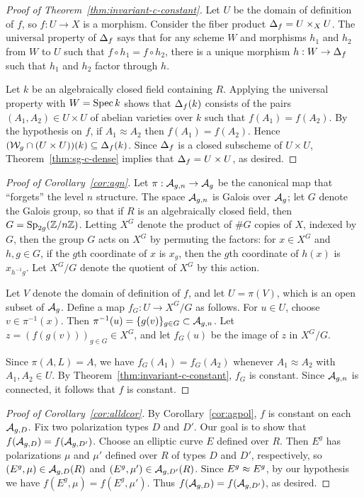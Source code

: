 \documentclass{amsart}
\begin{document}
\begin{proof}[Proof of Theorem~\ref{thm:invariant-c-constant}]
  Let $U$ be the domain of definition of $f$, so $f: U \to X$ is a morphism. Consider the fiber product $\Delta_f = U \times_X U$.
  The universal property of $\Delta_f$ says that for any scheme $W$ and morphisms $h_1$ and $h_2$ from $W$ to $U$ such that $f \circ h_1 = f \circ h_2$, there is a unique morphism $h: W \to \Delta_f$ such that $h_1$ and $h_2$ factor through $h$.

  Let $k$ be an algebraically closed field containing $R$.
  Applying the universal property with $W = \operatorname{Spec} k$ shows that $\Delta_f(k)$ consists of the pairs $(A_1,A_2) \in U \times U$ of abelian varieties over $k$ such that $f(A_1) = f(A_2)$.
  By the hypothesis on $f$, if $A_1 \approx A_2$ then $f(A_1) = f(A_2)$. Hence $(\mathcal{W}_g \cap (U \times U))(k) \subseteq \Delta_f(k)$.
  Since $\Delta_f$ is a closed subscheme of $U \times U$, Theorem~\ref{thm:sg-c-dense} implies that $\Delta_f = U \times U$, as desired.
\end{proof}

\begin{proof}[Proof of Corollary~\ref{cor:agn}]
  Let $\pi: \mathcal{A}_{g,n} \to \mathcal{A}_g$ be the canonical map that ``forgets'' the level $n$ structure. The space $\mathcal{A}_{g,n}$ is Galois over $\mathcal{A}_g$; let $G$ denote the Galois group, so that if $R$ is an algebraically closed field, then $G = \operatorname{Sp}_{2g}(\mathbb{Z}/n\mathbb{Z})$. Letting $X^G$ denote the product of $\# G$ copies of $X$, indexed by $G$, then the group $G$ acts on $X^G$ by permuting the factors: for $x \in X^G$ and $h,g \in G$, if the $g$th coordinate of $x$ is $x_g$, then the $g$th coordinate of $h(x)$ is $x_{h^{-1}g}$.
  Let $X^G/G$ denote the quotient of $X^G$ by this action.

  Let $V$ denote the domain of definition of $f$, and let $U = \pi(V)$, which is an open subset of $\mathcal{A}_g$. Define a map $f_G: U \to X^G/G$ as follows. For $u \in U$, choose  $v \in \pi^{-1}(x)$. Then $\pi^{-1}(u) = \{g(v)\}_{g \in G} \subset \mathcal{A}_{g,n}$. Let $z = (f(g(v)))_{g \in G} \in X^G$, and let $f_G(u)$ be the image of $z$ in $X^G/G$.

  Since $\pi(A,L) = A$, we have $f_G(A_1) = f_G(A_2)$ whenever $A_1 \approx A_2$ with $A_1,A_2 \in U$. By Theorem~\ref{thm:invariant-c-constant}, $f_G$ is constant. Since $\mathcal{A}_{g,n}$ is connected, it follows that $f$ is constant.
\end{proof}

\begin{proof}[Proof of Corollary~\ref{cor:alldcor}]
  By Corollary~\ref{cor:agpol}, $f$ is constant on each $\mathcal{A}_{g,{D}}$. 
 Fix two polarization types $D$ and $D'$. Our goal is to show that $f(\mathcal{A}_{g,{D}}) = f(\mathcal{A}_{g,{D'}})$. Choose an elliptic curve $E$ defined over $R$. Then $E^g$ has polarizations $\mu$ and $\mu'$ defined over $R$ of types $D$ and $D'$, respectively, so $(E^g, \mu) \in \mathcal{A}_{g,{D}}(R)$ and $(E^g,\mu') \in \mathcal{A}_{g,{D'}}(R)$. Since $E^g \approx E^g$, by our hypothesis we have $f(E^g, \mu) = f(E^g, \mu')$. Thus $f(\mathcal{A}_{g,{D}}) = f(\mathcal{A}_{g,{D'}})$, as desired. 
\end{proof}
\end{document}
